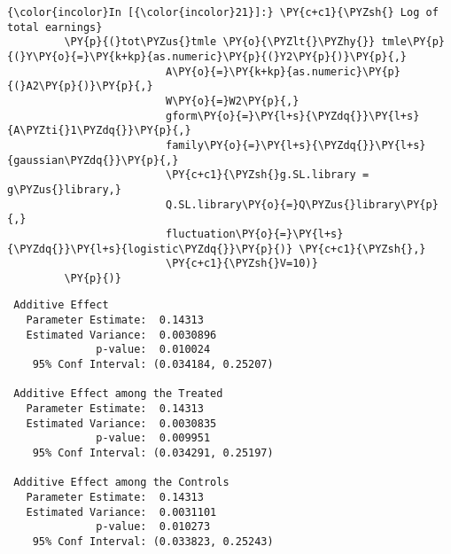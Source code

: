    \begin{Verbatim}[commandchars=\\\{\}]
{\color{incolor}In [{\color{incolor}21}]:} \PY{c+c1}{\PYZsh{} Log of total earnings}
         \PY{p}{(}tot\PYZus{}tmle \PY{o}{\PYZlt{}\PYZhy{}} tmle\PY{p}{(}Y\PY{o}{=}\PY{k+kp}{as.numeric}\PY{p}{(}Y2\PY{p}{)}\PY{p}{,}
                         A\PY{o}{=}\PY{k+kp}{as.numeric}\PY{p}{(}A2\PY{p}{)}\PY{p}{,}
                         W\PY{o}{=}W2\PY{p}{,}
                         gform\PY{o}{=}\PY{l+s}{\PYZdq{}}\PY{l+s}{A\PYZti{}1\PYZdq{}}\PY{p}{,}
                         family\PY{o}{=}\PY{l+s}{\PYZdq{}}\PY{l+s}{gaussian\PYZdq{}}\PY{p}{,}
                         \PY{c+c1}{\PYZsh{}g.SL.library = g\PYZus{}library,}
                         Q.SL.library\PY{o}{=}Q\PYZus{}library\PY{p}{,}
                         fluctuation\PY{o}{=}\PY{l+s}{\PYZdq{}}\PY{l+s}{logistic\PYZdq{}}\PY{p}{)} \PY{c+c1}{\PYZsh{},}
                         \PY{c+c1}{\PYZsh{}V=10)}
         \PY{p}{)}
\end{Verbatim}


    
    \begin{verbatim}
 Additive Effect
   Parameter Estimate:  0.14313
   Estimated Variance:  0.0030896
              p-value:  0.010024
    95% Conf Interval: (0.034184, 0.25207) 

 Additive Effect among the Treated
   Parameter Estimate:  0.14313
   Estimated Variance:  0.0030835
              p-value:  0.009951
    95% Conf Interval: (0.034291, 0.25197) 

 Additive Effect among the Controls
   Parameter Estimate:  0.14313
   Estimated Variance:  0.0031101
              p-value:  0.010273
    95% Conf Interval: (0.033823, 0.25243) 
    \end{verbatim}

 